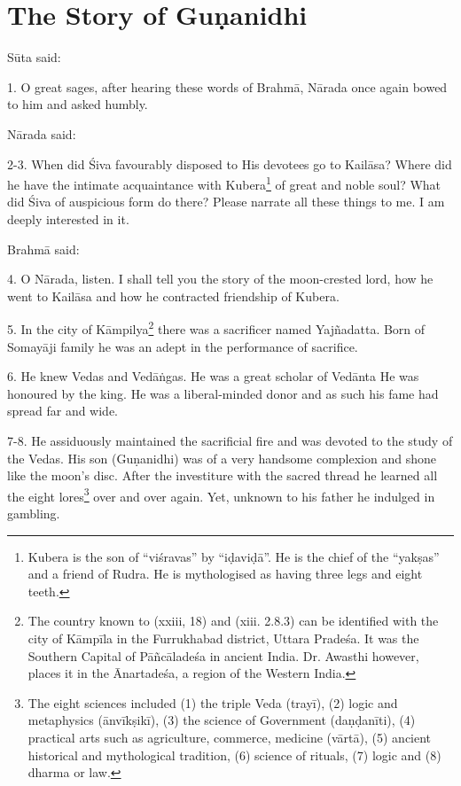 \chapter{The Story of Guṇanidhi}

Sūta said:

1. O great sages, after hearing these words of Brahmā, Nārada once again bowed
to him and asked humbly.

Nārada said:

2-3. When did Śiva favourably disposed to His devotees go to Kailāsa? Where did
he have the intimate acquaintance with Kubera\footnote{Kubera is the son of
“viśravas” by “iḍaviḍā”. He is the chief of the “yakṣas” and a friend of Rudra.
He is mythologised as having three legs and eight teeth.} of great and noble
soul? What did Śiva of auspicious form do there? Please narrate all these things
to me. I am deeply interested in it.

Brahmā said:

4. O Nārada, listen. I shall tell you the story of the moon-crested lord, how he
went to Kailāsa and how he contracted friendship of Kubera.

5. In the city of Kāmpilya\footnote{The country known to 
(xxiii, 18) and  (xiii. 2.8.3) can be identified with
the city of Kāmpīla in the Furrukhabad district, Uttara Pradeśa. It was
the Southern Capital of Pāñcāladeśa in ancient India. Dr. Awasthi however,
places it in the Ānartadeśa, a region of the Western India.} there was
a sacrificer named Yajñadatta. Born of Somayāji family he was an adept in
the performance of sacrifice.

6. He knew Vedas and Vedāṅgas. He was a great scholar of Vedānta \etc He was
honoured by the king. He was a liberal-minded donor and as such his fame had
spread far and wide.

7-8. He assiduously maintained the sacrificial fire and was devoted to the study
of the Vedas. His son (Guṇanidhi) was of a very handsome complexion and shone
like the moon’s disc. After the investiture with the sacred thread he learned
all the eight lores\footnote{The eight sciences included (1) the triple Veda
(trayī), (2) logic and metaphysics (ānvīkṣikī), (3) the science of Government
(daṇḍanīti), (4) practical arts such as agriculture, commerce, medicine \etc
(vārtā), (5) ancient historical and mythological tradition, (6) science of
rituals, (7) logic and (8) dharma or law.} over and over again. Yet, unknown to
his father he indulged in gambling.

